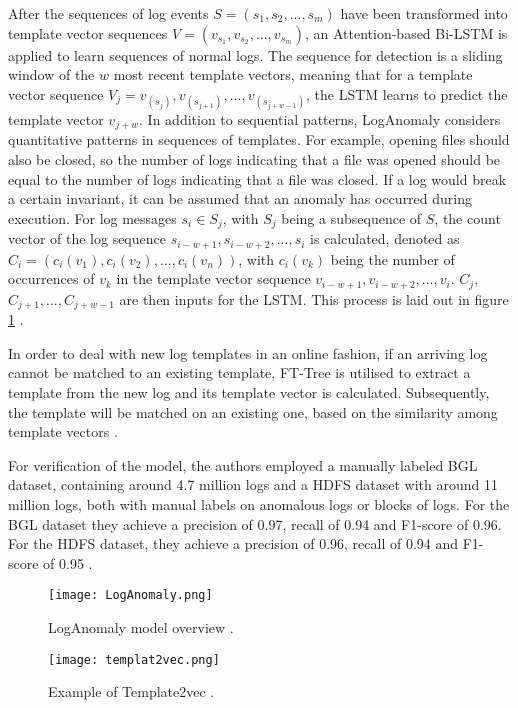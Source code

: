 After the sequences of log events $S=(s_1, s_2,...,s_m)$ have been transformed into template vector sequences $V=(v_{s_1}, v_{s_2},...,v_{s_m})$, an Attention-based Bi-LSTM is applied to learn sequences of normal logs. The sequence for detection is a sliding window of the $w$ most recent template vectors, meaning that for a template vector sequence $V_j = v_{(s_j)}, v_{(s_{j+1})}, ..., v_{(s_{j+w-1})}$, the LSTM learns to predict the template vector $v_{j+w}$. In addition to sequential patterns, LogAnomaly considers quantitative patterns in sequences of templates. For example, opening files should also be closed, so the number of logs indicating that a file was opened should be equal to the number of logs indicating that a file was closed. If a log would break a certain invariant, it can be assumed that an anomaly has occurred during execution. For log messages $s_i \in S_j$, with $S_j$ being a subsequence of $S$, the count vector of the log sequence $s_{i-w+1},s_{i-w+2},...,s_i$ is calculated, denoted as $C_i = (c_i(v_1), c_i(v_2), ..., c_i(v_n))$, with $c_i(v_k)$ being the number of occurrences of $v_k$ in the template vector sequence $v_{i-w+1}, v_{i-w+2},..., v_i$. $C_j$, $C_{j+1}, ..., C_{j+w-1}$ are then inputs for the LSTM. This process is laid out in figure \ref{fig:loganomaly} \cite{meng2019loganomaly}.

In order to deal with new log templates in an online fashion, if an arriving log cannot be matched to an existing template, FT-Tree is utilised to extract a template from the new log and its template vector is calculated. Subsequently, the template will be matched on an existing one, based on the similarity among template vectors \cite{meng2019loganomaly}.

For verification of the model, the authors employed a manually labeled BGL dataset, containing around 4.7 million logs and a HDFS dataset with around 11 million logs, both with manual labels on anomalous logs or blocks of logs. For the BGL dataset they achieve a precision of 0.97, recall of 0.94 and F1-score of 0.96. For the HDFS dataset, they achieve a precision of 0.96, recall of 0.94 and F1-score of 0.95 \cite{meng2019loganomaly}.

\begin{figure}[h]
  \centering
  \texttt{[image: LogAnomaly.png]}\\
  \caption{LogAnomaly model overview \cite{meng2019loganomaly}.}
  \label{fig:loganomaly}
\end{figure}

\begin{figure}[h]
  \centering
  \texttt{[image: templat2vec.png]}\\
  \caption{Example of Template2vec \cite{meng2019loganomaly}.}
  \label{fig:template2vec}
\end{figure}


